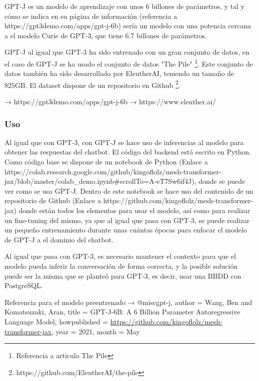GPT-J es un modelo de aprendizaje con unos 6 billones de parámetros, y tal y cómo se indica en su página de información (referencia a https://gpt3demo.com/apps/gpt-j-6b) sería un modelo con una potencia cercana a el modelo Curie de GPT-3, que tiene 6.7 billones de parámetros.

GPT-J al igual que GPT-3 ha sido entrenado con un gran conjunto de datos, en el caso de GPT-J se ha usado el conjunto de datos "The Pile" \footnote{Referencia a articulo The Pile}. Este conjunto de datos también ha sido desarrollado por EleutherAI, teniendo un tamaño de 825GB. El dataset dispone de un repositorio en Github \footnote{https://github.com/EleutherAI/the-pile}.






→ https://gpt3demo.com/apps/gpt-j-6b
→ https://www.eleuther.ai/

\subsubsection*{Uso}

Al igual que con GPT-3, con GPT-J se hace uso de inferencias al modelo para obtener las respuestas del chatbot. El código del backend está escrito en Python. Como código base se dispone de un notebook de Python (Enlace a https://colab.research.google.com/github/kingoflolz/mesh-transformer-jax/blob/master/colab\_demo.ipynb\#scrollTo=A-eT7Sw6if4J), donde se puede ver como se usa GPT-J. Dentro de este notebook se hace uso del contenido de un repositorio de Github (Enlace a https://github.com/kingoflolz/mesh-transformer-jax) donde están todos los elementos para usar el modelo, así como para realizar un fine-tuning del mismo, ya que al igual que pasa con GPT-3, se puede realizar un pequeño entrenamiento durante unas cuántas épocas para enfocar el modelo de GPT-J a el dominio del chatbot.

Al igual que pasa con GPT-3, es necesario mantener el contexto para que el modelo pueda inferir la conversación de forma correcta, y la posible solución puede ser la misma que se planteó para GPT-3, es decir, usar una BBDD con PostgreSQL.







Referencia para el modelo preentrenado → @misc{gpt-j,
  author = {Wang, Ben and Komatsuzaki, Aran},
  title = {{GPT-J-6B: A 6 Billion Parameter Autoregressive Language Model}},
  howpublished = {\url{https://github.com/kingoflolz/mesh-transformer-jax}},
  year = 2021,
  month = May
}

